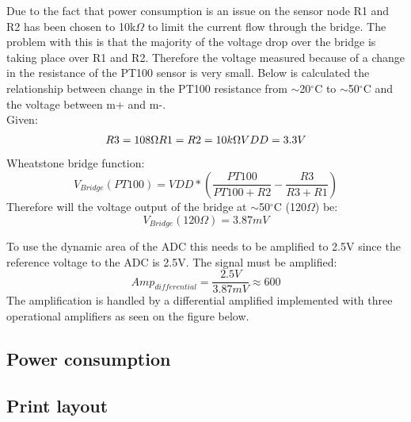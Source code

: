Due to the fact that power consumption is an issue on the sensor node R1 and R2 has been chosen to 10k$\Omega$ to limit the current flow through the bridge. The problem with this is that the majority of the voltage drop over the bridge is taking place over R1 and R2. Therefore the voltage measured because of a change in the resistance of the PT100 sensor is very small. Below is calculated the relationship between change in the PT100 resistance from $\sim$20$^\circ$C to $\sim$50$^\circ$C and the voltage between m+ and m-.\\
Given:
\begin{equation}
		R3=108\Omega $\\$ R1=R2=10k\Omega $\\$ VDD=3.3V
\end{equation}
Wheatstone bridge function:
\begin{equation}
		V_{Bridge}(PT100)=VDD*\left(\frac{PT100}{PT100+R2}-\frac{R3}{R3+R1}\right)
\end{equation}
Therefore will the voltage output of the bridge at $\sim$50$^\circ$C (120$\Omega$) be:
\begin{equation}
	V_{Bridge}(120\Omega)= 3.87mV
\end{equation}

To use the dynamic area of the ADC this needs to be amplified to 2.5V since the reference voltage to the ADC is 2.5V. The signal must be amplified:
\begin{equation}
	Amp_{differential}=\frac{2.5V}{3.87mV}\approx600
\end{equation}
The amplification is handled by a differential amplified implemented with three operational amplifiers as seen on the figure below.



\subsection{Power consumption}


\subsection{Print layout}






